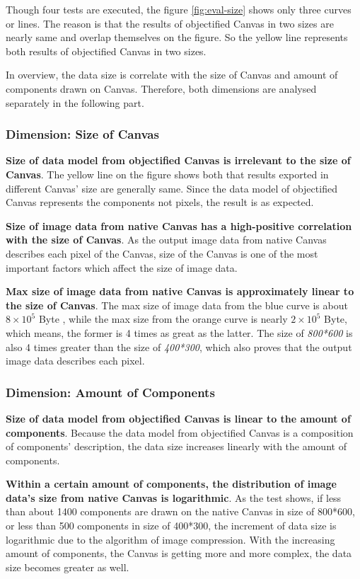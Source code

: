 Though four tests are executed, the figure \ref{fig:eval-size} shows only three curves or lines. The reason is that the results of objectified Canvas in two sizes are nearly same and overlap themselves on the figure. So the yellow line represents both results of objectified Canvas in  two sizes.

In overview, the data size is correlate with the size of Canvas and amount of components drawn on Canvas. Therefore, both dimensions are analysed separately in the following part.

\subsubsection{Dimension: Size of Canvas}


\textbf{Size of data model from objectified Canvas is irrelevant to the size of Canvas}. The yellow line on the figure shows both that results exported in different Canvas' size are generally same. Since the data model of objectified Canvas represents the components not pixels, the result is as expected.   

\textbf{Size of image data from native Canvas has a high-positive correlation with the size of Canvas}. As the output image data from native Canvas describes each pixel of the Canvas, size of the Canvas is one of the most important factors which affect the size of image data.

\textbf{Max size of image data from native Canvas is approximately linear to the size of Canvas}. The max size of image data from the blue curve is about $8\times 10^{5}$ Byte , while the max size from the orange curve is nearly $2\times 10^{5}$ Byte, which means, the former is 4 times as great as the latter. The size of \textit{800*600} is also 4 times greater than the size of \textit{400*300}, which also proves that the output image data describes each pixel.


\subsubsection{Dimension: Amount of Components}


\textbf{Size of data model from objectified Canvas is linear to the amount of components}. Because the data model from objectified Canvas is a composition of components' description, the data size increases linearly with the amount of components.

\textbf{Within a certain amount of components, the distribution of image data's size from native Canvas is logarithmic}. As the test shows, if less than about 1400 components are drawn on the native Canvas in size of 800*600, or less than 500 components in size of 400*300, the increment of data size is logarithmic due to the algorithm of image compression. With the increasing amount of components, the Canvas is getting more and more complex, the data size becomes greater as well.  

